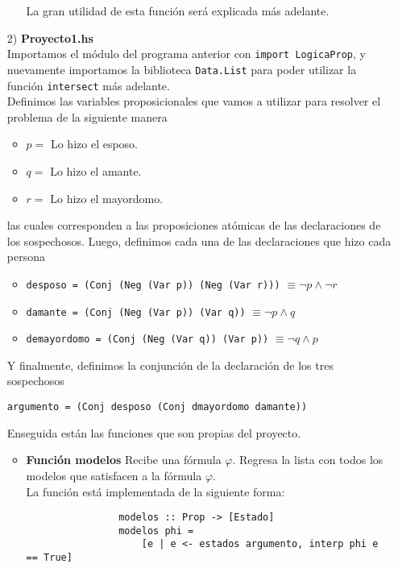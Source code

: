 \documentclass[letterpaper,11pt]{article}
\begin{document}
\begin{itemize}
\begin{itemize}
            La gran utilidad de esta función será explicada más adelante.
        \end{itemize}

        \item[2)] \textbf{Proyecto1.hs} \\
        Importamos el módulo del programa anterior con 
        \texttt{import LogicaProp}, y nuevamente importamos la biblioteca 
        \texttt{Data.List} para poder utilizar la función \texttt{intersect}
        más adelante. \\
        Definimos las variables proposicionales que vamos a utilizar para 
        resolver el problema de la siguiente manera
    
        \begin{itemize}
            \item $p =$ Lo hizo el esposo.
            \item $q =$ Lo hizo el amante.
            \item $r =$ Lo hizo el mayordomo.
        \end{itemize}

        las cuales corresponden a las proposiciones atómicas de las 
        declaraciones de los sospechosos. Luego, definimos cada una de las 
        declaraciones que hizo cada persona

        \begin{itemize}
            \item \texttt{desposo = (Conj (Neg (Var p)) (Neg (Var r)))}
            $\equiv \neg p \land \neg r$
            \item \texttt{damante = (Conj (Neg (Var p)) (Var q))}
            $\equiv \neg p \land q$
            \item \texttt{demayordomo = (Conj (Neg (Var q)) (Var p))}
            $\equiv \neg q \land p$
        \end{itemize}

        Y finalmente, definimos la conjunción de la declaración de los tres 
        sospechosos
        \begin{center}
            \texttt{argumento = (Conj desposo (Conj dmayordomo damante))}
        \end{center}

        Enseguida están las funciones que son propias del proyecto.

        \begin{itemize}
            \item \textbf{Función modelos} Recibe una fórmula $\varphi$. 
            Regresa la lista con todos los modelos que satisfacen a la 
            fórmula $\varphi$. \\
            La función está implementada de la siguiente forma:
            \begin{lstlisting}
                modelos :: Prop -> [Estado]
                modelos phi = 
                    [e | e <- estados argumento, interp phi e == True]
            \end{lstlisting}
            

\end{itemize}
\end{itemize}
\end{document}
